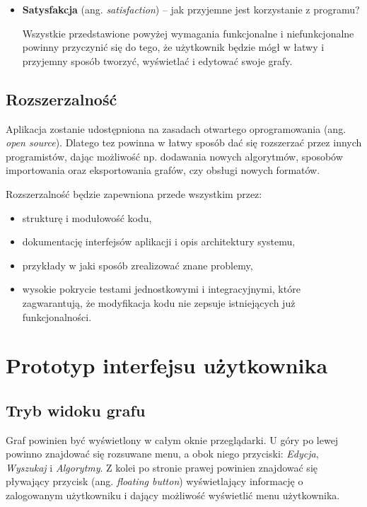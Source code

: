 \begin{itemize}
\item \textbf{Satysfakcja} (ang. \textit{satisfaction}) -- jak przyjemne jest korzystanie z programu?

Wszystkie przedstawione powyżej wymagania funkcjonalne i niefunkcjonalne powinny przyczynić się do tego, że użytkownik będzie mógł w łatwy i przyjemny sposób tworzyć, wyświetlać i edytować swoje grafy.

\end{itemize}

\subsection{Rozszerzalność}

Aplikacja zostanie udostępniona na zasadach otwartego oprogramowania (ang. \textit{open source}). Dlatego tez powinna w łatwy sposób dać się rozszerzać przez innych programistów, dając możliwość np. dodawania nowych algorytmów, sposobów importowania oraz eksportowania grafów, czy obsługi nowych formatów. 

Rozszerzalność będzie zapewniona przede wszystkim przez: 
\begin{itemize}
\setlength\itemsep{0em}
\item strukturę i modułowość kodu, 
\item dokumentację interfejsów aplikacji i opis architektury systemu, 
\item przykłady w jaki sposób zrealizować znane problemy, 
\item wysokie pokrycie testami jednostkowymi i integracyjnymi, które zagwarantują, że modyfikacja kodu nie zepsuje istniejących już funkcjonalności. 
\end{itemize}

\pagebreak

\section{Prototyp interfejsu użytkownika}

\subsection*{Tryb widoku grafu}

Graf powinien być wyświetlony w całym oknie przeglądarki. U góry po lewej powinno znajdować się rozsuwane menu, a obok niego przyciski: \textit{Edycja}, \textit{Wyszukaj} i \textit{Algorytmy}. Z kolei po stronie prawej powinien znajdować się pływający przycisk (ang. \textit{floating button}) wyświetlający informację o zalogowanym użytkowniku i dający możliwość wyświetlić menu użytkownika. 

